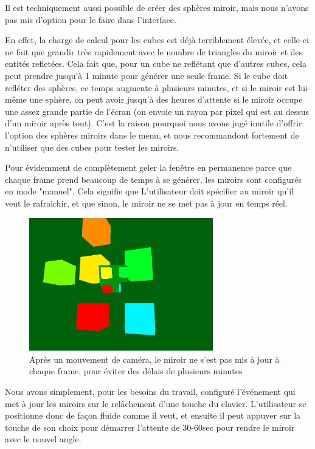 Il est techniquement aussi possible de créer des sphères miroir, mais nous n'avons pas mis d'option pour le faire dans l'interface.

En effet, la charge de calcul pour les cubes est déjà terriblement élevée, et celle-ci ne fait que grandir très rapidement avec le nombre de triangles du miroir et des entités refletées. Cela fait que, pour un cube ne reflétant que d'autres cubes, cela peut prendre jusqu'à 1 minute pour générer une seule frame. Si le cube doit refléter des sphères, ce temps augmente à plusieurs minutes, et si le miroir est lui-même une sphère, on peut avoir jusqu'à des heures d'attente si le miroir occupe une assez grande partie de l'écran (on envoie un rayon par pixel qui est au dessus d'un miroir après tout). C'est la raison pourquoi nous avons jugé inutile d'offrir l'option des sphères miroirs dans le menu, et nous recommandont fortement de n'utiliser que des cubes pour tester les miroirs.

Pour évidemment de complètement geler la fenêtre en permanence parce que chaque frame prend beaucoup de temps à se générer, les miroirs sont configurés en mode "manuel". Cela signifie que L'utilisateur doit spécifier au miroir qu'il veut le rafraichir, et que sinon, le miroir ne se met pas à jour en temps réel.

\begin{figure}[h]
	\centering
	\includegraphics[width=8cm]{fig/CubeReflectionRefreshManuel.png}
	\caption{Après un mouvement de caméra, le miroir ne s'est pas mis à jour à chaque frame, pour éviter des délais de plusieurs minutes}
	\label{fig:propriete}
\end{figure}

Nous avons simplement, pour les besoins du travail, configuré l'événement qui met à jour les miroirs sur le relâchement d'une touche du clavier. L'utilisateur se positionne donc de façon fluide comme il veut, et ensuite il peut appuyer sur la touche de son choix pour démarrer l'attente de 30-60sec pour rendre le miroir avec le nouvel angle.

